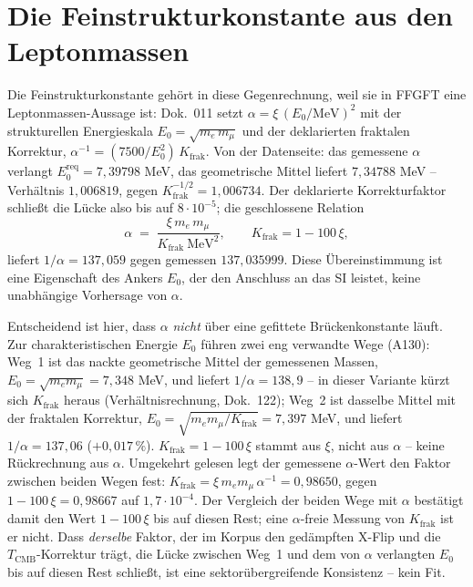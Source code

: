 \section{Die Feinstrukturkonstante aus den Leptonmassen}
Die Feinstrukturkonstante gehört in diese Gegenrechnung, weil sie in FFGFT
eine Leptonmassen-Aussage ist: Dok.~011 setzt
$\alpha = \xi\,(E_0/\text{MeV})^2$ mit der strukturellen Energieskala
$E_0=\sqrt{m_e\,m_\mu}$ und der deklarierten fraktalen Korrektur,
$\alpha^{-1} = (7500/E_0^2)\,K_{\text{frak}}$. Von der Datenseite: das
gemessene $\alpha$ verlangt $E_0^{\text{req}}=7{,}39798$ MeV, das
geometrische Mittel liefert $7{,}34788$ MeV -- Verhältnis $1{,}006819$,
gegen $K_{\text{frak}}^{-1/2}=1{,}006734$. Der deklarierte
Korrekturfaktor schließt die Lücke also bis auf $8\cdot10^{-5}$; die
geschlossene Relation
\begin{equation}
  \alpha \;=\; \frac{\xi\, m_e\, m_\mu}{K_{\text{frak}}\ \text{MeV}^2},
  \qquad K_{\text{frak}}=1-100\,\xi,
\end{equation}
liefert $1/\alpha = 137{,}059$ gegen gemessen $137{,}035999$. Diese
Übereinstimmung ist eine Eigenschaft des Ankers $E_0$, der den Anschluss an
das SI leistet, keine unabhängige Vorhersage von $\alpha$.

Entscheidend ist hier, dass $\alpha$ \emph{nicht} über eine gefittete
Brückenkonstante läuft. Zur charakteristischen Energie $E_0$ führen zwei eng
verwandte Wege (A130): Weg~1 ist das nackte geometrische Mittel der
gemessenen Massen, $E_0=\sqrt{m_e m_\mu}=7{,}348$ MeV, und liefert
$1/\alpha = 138{,}9$ -- in dieser Variante kürzt sich $K_{\text{frak}}$ heraus (Verhältnisrechnung, Dok.~122); Weg~2 ist dasselbe Mittel mit der fraktalen Korrektur,
$E_0=\sqrt{m_e m_\mu/K_{\text{frak}}}=7{,}397$ MeV, und liefert
$1/\alpha = 137{,}06$ ($+0{,}017\,\%$). $K_{\text{frak}}=1-100\,\xi$ stammt aus
$\xi$, nicht aus $\alpha$ -- keine Rückrechnung aus $\alpha$. Umgekehrt
gelesen legt der gemessene $\alpha$-Wert den Faktor zwischen beiden Wegen
fest: $K_{\text{frak}} = \xi\,m_e m_\mu\,\alpha^{-1} = 0{,}98650$, gegen
$1-100\,\xi = 0{,}98667$ auf $1{,}7\cdot10^{-4}$. Der Vergleich der beiden Wege
mit $\alpha$ bestätigt damit den Wert $1-100\,\xi$ bis auf diesen Rest; eine
$\alpha$-freie Messung von $K_{\text{frak}}$ ist er nicht. Dass \emph{derselbe} Faktor, der im Korpus den
gedämpften X-Flip und die $T_{\text{CMB}}$-Korrektur trägt, die Lücke
zwischen Weg~1 und dem von $\alpha$ verlangten $E_0$ bis auf diesen Rest
schließt, ist eine sektorübergreifende Konsistenz -- kein Fit.

